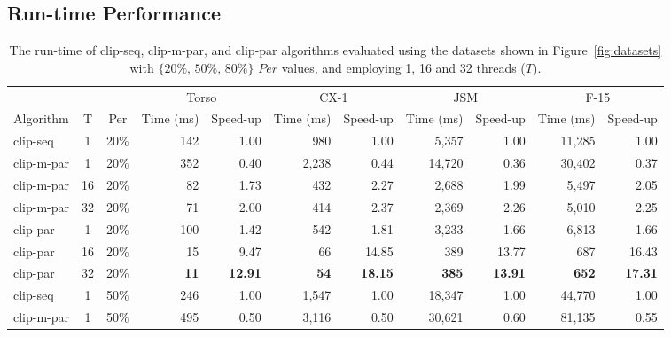 \documentclass{egpubl}
\begin{document}
\subsection{Run-time Performance}

\begin{table}[t]
\centering
\caption{
The run-time of clip-seq, clip-m-par, and clip-par algorithms evaluated using the datasets shown in Figure~\ref{fig:datasets} with   $\textit{\{20\%, 50\%, 80\%\}}$ $Per$ values,
and employing 1, 16 and 32 threads ($T$).}
\label{tab:run-time}
\begin{tabular}{lcc@{\quad\quad}rr@{\quad\quad}rr@{\quad\quad}rr@{\quad\quad}rr}
\toprule
\multicolumn{3}{l}{}  & \multicolumn{2}{c}{Torso}  & \multicolumn{2}{c}{CX-1} & \multicolumn{2}{c}{JSM}  & \multicolumn{2}{c}{F-15}     \\
Algorithm  & T  & Per & Time (ms)  & Speed-up      & Time (ms) & Speed-up     & Time (ms) & Speed-up     & Time (ms)    & Speed-up     \\
\midrule
clip-seq   & 1  & 20\% & 142        & 1.00         & 980       & 1.00         & 5,357      & 1.00         & 11,285       & 1.00         \\
clip-m-par & 1  & 20\% & 352        & 0.40         & 2,238     & 0.44         & 14,720     & 0.36         & 30,402       & 0.37         \\
clip-m-par & 16 & 20\% & 82         & 1.73         & 432       & 2.27         & 2,688      & 1.99         & 5,497        & 2.05         \\
clip-m-par & 32 & 20\% & 71         & 2.00         & 414       & 2.37         & 2,369      & 2.26         & 5,010        & 2.25         \\
clip-par   & 1  & 20\% & 100        & 1.42         & 542       & 1.81         & 3,233      & 1.66         & 6,813        & 1.66         \\
clip-par   & 16 & 20\% & 15         & 9.47         & 66        & 14.85        & 389        & 13.77        & 687          & 16.43        \\
clip-par   & 32 & 20\% &\textbf{11} &\textbf{12.91}&\textbf{54}&\textbf{18.15}&\textbf{385}&\textbf{13.91}&\textbf{652}  &\textbf{17.31}\\[1ex]
clip-seq   & 1  & 50\% & 246        & 1.00         & 1,547     & 1.00         & 18,347     & 1.00         & 44,770       & 1.00         \\
clip-m-par & 1  & 50\% & 495        & 0.50         & 3,116     & 0.50         & 30,621     & 0.60         & 81,135       & 0.55         \\

\end{tabular}
\end{table}
\end{document}
